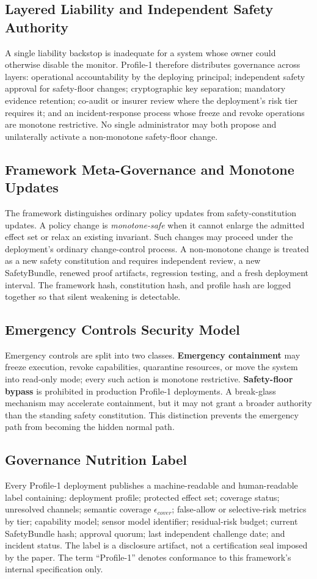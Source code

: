 \documentclass[11pt]{article}
\def\ensuremath#1{#1}%
\def\mathrm#1{#1}%
\newcommand{\epscover}{\ensuremath{\epsilon_{\mathrm{cover}}}}
\newcommand{\SafetyBundle}{\textsf{SafetyBundle}}
\begin{document}
\subsection{Layered Liability and Independent Safety Authority}
A single liability backstop is inadequate for a system whose owner could otherwise disable the monitor. Profile-1 therefore distributes governance across layers: operational accountability by the deploying principal; independent safety approval for safety-floor changes; cryptographic key separation; mandatory evidence retention; co-audit or insurer review where the deployment's risk tier requires it; and an incident-response process whose freeze and revoke operations are monotone restrictive. No single administrator may both propose and unilaterally activate a non-monotone safety-floor change.

\subsection{Framework Meta-Governance and Monotone Updates}
The framework distinguishes ordinary policy updates from safety-constitution updates. A policy change is \emph{monotone-safe} when it cannot enlarge the admitted effect set or relax an existing invariant. Such changes may proceed under the deployment's ordinary change-control process. A non-monotone change is treated as a new safety constitution and requires independent review, a new \SafetyBundle{}, renewed proof artifacts, regression testing, and a fresh deployment interval. The framework hash, constitution hash, and profile hash are logged together so that silent weakening is detectable.

\subsection{Emergency Controls Security Model}
Emergency controls are split into two classes. \textbf{Emergency containment} may freeze execution, revoke capabilities, quarantine resources, or move the system into read-only mode; every such action is monotone restrictive. \textbf{Safety-floor bypass} is prohibited in production Profile-1 deployments. A break-glass mechanism may accelerate containment, but it may not grant a broader authority than the standing safety constitution. This distinction prevents the emergency path from becoming the hidden normal path.

\subsection{Governance Nutrition Label}
Every Profile-1 deployment publishes a machine-readable and human-readable label containing: deployment profile; protected effect set; coverage status; unresolved channels; semantic coverage \(\epscover\); false-allow or selective-risk metrics by tier; capability model; sensor model identifier; residual-risk budget; current \SafetyBundle{} hash; approval quorum; last independent challenge date; and incident status. The label is a disclosure artifact, not a certification seal imposed by the paper. The term ``Profile-1'' denotes conformance to this framework's internal specification only.
\end{document}
